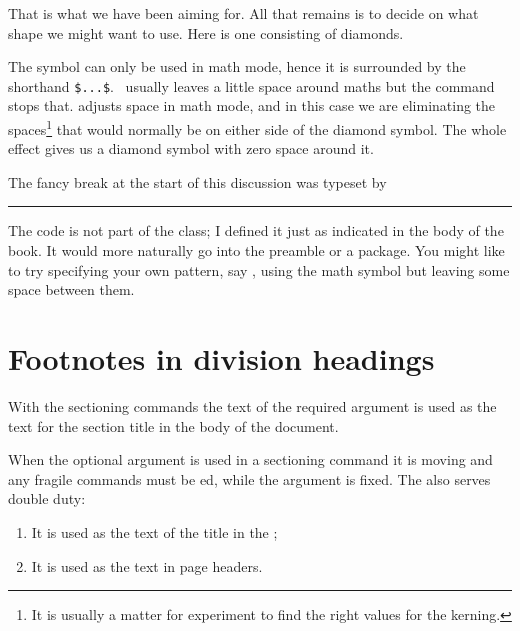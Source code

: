     That is what we have been aiming for. All that
remains is to decide on what shape we might want to use. Here is one
consisting of diamonds.
\begin{lcode}
\makeatletter
\newcommand{\diamonds}{\m@th$\mkern-.6mu \diamond \mkern-.6mu$}
\makeatother
\end{lcode}
The \cmd{\diamond} symbol can only be used in math mode, hence it
is surrounded by the shorthand \verb?$...$?. \tx\ usually leaves a little
space around maths but the \cmd{\m@th} command stops that. \cmd{\mkern}
adjusts space in math mode, and in this case we are eliminating
the spaces\footnote{It is usually a matter for experiment to find
the right values for the kerning.\label{fn:kerning}} 
that would normally be on either 
side of the diamond symbol.
The whole effect gives us a diamond symbol with zero space around it.

    The fancy break at the start of this discussion was typeset by
\begin{lcode}
\fancybreak{\chain{\diamonds}{0.25\textwidth}}
\end{lcode}
The code is not part of the  class; I defined it just
as indicated in the body of the book. It would more naturally go
into the preamble or a package. You might like to try specifying your
own pattern, say , using the \cmd{\club} math symbol but leaving
some space between them.



\section{Footnotes in division headings}


    With the sectioning commands the text of the required argument
 is used as the text for the section title in the body
of the document.

    When the optional argument  is used in a sectioning
command it is moving and any fragile 
commands must be \cmd{\protect}ed,
while the  argument is fixed. The  also
serves double duty:
\begin{enumerate}
\item It is used as the text of the title in the \toc;
\item It is used as the text in page headers. 
\end{enumerate}

